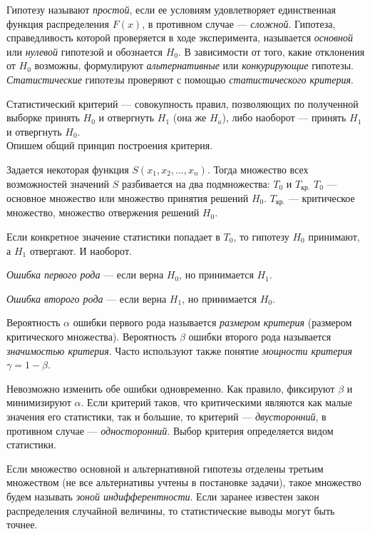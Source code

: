 \documentclass[12pt]{article}
\begin{document}
Гипотезу называют \emph{простой}, если ее условиям удовлетворяет единственная функция распределения $F(x)$, в противном случае --- \emph{сложной}. Гипотеза, справедливость которой проверяется в ходе эксперимента, называется \emph{основной} или \emph{нулевой} гипотезой и обознается $H_0$. В зависимости от того, какие отклонения от $H_0$ возможны, формулируют \emph{альтернативные} или \emph{конкурирующие} гипотезы. \emph{Статистические} гипотезы проверяют с помощью \emph{статистического критерия}.

Статистический критерий --- совокупность правил, позволяющих по полученной выборке принять $H_0$ и отвергнуть $H_1$ (она же $H_a$), либо наоборот --- принять $H_1$ и отвергнуть $H_0$.\\

Опишем общий принцип построения критерия.

Задается некоторая функция $S(x_1, x_2, \ldots, x_n)$. Тогда множество всех возможностей значений $S$ разбивается на два подмножества: $T_0$ и $T_{\text{кр.}}$ $T_0$ --- основное множество или множество принятия решений $H_0$. $T_{\text{кр.}}$ --- критическое множество, множество отвержения решений $H_0$.

Если конкретное значение статистики попадает в $T_0$, то гипотезу $H_0$ принимают, а $H_1$ отвергают. И наоборот.

\emph{Ошибка первого рода} --- если верна $H_0$, но принимается $H_1$.

\emph{Ошибка второго рода} --- если верна $H_1$, но принимается $H_0$.

Вероятность $\alpha$ ошибки первого рода называется \emph{размером критерия} (размером критического множества). Вероятность $\beta$  ошибки второго рода называется \emph{значимостью критерия}. Часто используют также понятие \emph{мощности критерия} $\gamma = 1 - \beta$.


Невозможно изменить обе ошибки одновременно. Как правило, фиксируют $\beta$ и минимизируют $\alpha$. Если критерий таков, что критическими являются как малые значения его статистики, так и большие, то критерий --- \emph{двусторонний}, в противном случае --- \emph{односторонний}. Выбор критерия определяется видом статистики.

Если множество основной и альтернативной гипотезы отделены третьим множеством (не все альтернативы учтены в постановке задачи), такое множество будем называть \emph{зоной индифферентности}. Если заранее известен закон распределения случайной величины, то статистические выводы могут быть точнее.
\end{document}
